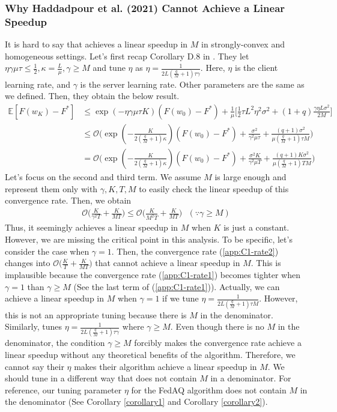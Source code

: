 \subsubsection{Why Haddadpour et al. (2021) Cannot Achieve a Linear Speedup}
It is hard to say that \cite{haddadpour2021federated} achieves a linear speedup in $M$ in strongly-convex and homogeneous settings. Let's first recap Corollary D.8 in \cite{haddadpour2021federated}. They let $\eta\gamma\mu\tau \leq \frac{1}{2}, \kappa = \frac{L}{\mu}, \gamma \geq M$ and tune $\eta$ as $\eta = \frac{1}{2L(\frac{q}{M}+1)\tau\gamma}$. Here, $\eta$ is the client learning rate, and $\gamma$ is the server learning rate. Other parameters are the same as we defined. Then, they obtain the below result.
\begin{align} \label{app:C1-rate1}
    \mathbb{E}[F(w_K)- F^*] &\leq \exp(-\eta\gamma\mu\tau K)(F(w_0) - F^*) + \frac{1}{\mu}\Big[\frac{1}{2}\tau L^2\eta^2\sigma^2 + (1+q)\frac{\gamma\eta L\sigma^2}{2M}\Big] \\
    &\leq \mathcal{O} \Big(\exp(-\frac{K}{2(\frac{q}{M}+1)\kappa})(F(w_0) - F^*) + \frac{\sigma^2}{\gamma^2\mu\tau} + \frac{(q+1)\sigma^2}{\mu(\frac{q}{M}+1)\tau M} \Big) \nonumber \\
    &= \mathcal{O} \Big(\exp(-\frac{K}{2(\frac{q}{M}+1)\kappa})(F(w_0) - F^*) + \frac{\sigma^2 K}{\gamma^2\mu T} + \frac{(q+1)K \sigma^2}{\mu(\frac{q}{M}+1)T M} \Big) \nonumber
\end{align}
Let's focus on the second and third term. We assume $M$ is large enough and represent them only with $\gamma, K, T, M$ to easily check the linear speedup of this convergence rate. Then, we obtain
\begin{align} \label{app:C1-rate2}
    \mathcal{O}\Big( \frac{K}{\gamma^2 T} + \frac{K}{MT}\Big) \leq \mathcal{O}\Big( \frac{K}{M^2 T} + \frac{K}{MT}\Big) \textrm{ }(\because \gamma \geq M)
\end{align}
Thus, it seemingly achieves a linear speedup in $M$ when $K$ is just a constant. However, we are missing the critical point in this analysis. To be specific, let's consider the case when $\gamma = 1$. Then, the convergence rate (\ref{app:C1-rate2}) changes into $\mathcal{O}\Big( \frac{K}{T} + \frac{K}{MT}\Big)$ that cannot achieve a linear speedup in $M$. This is implausible because the convergence rate (\ref{app:C1-rate1}) becomes tighter when $\gamma = 1$ than $\gamma \geq M$ (See the last term of (\ref{app:C1-rate1})). Actually, we can achieve a linear speedup in $M$ when $\gamma = 1$ if we tune $\eta = \frac{1}{2L(\frac{q}{M}+1)\tau M}$. However, this is not an appropriate tuning because there is $M$ in the denominator. Similarly, \cite{haddadpour2021federated} tunes $\eta = \frac{1}{2L(\frac{q}{M}+1)\tau\gamma}$ where $\gamma \geq M$. Even though there is no $M$ in the denominator, the condition $\gamma \geq M$ forcibly makes the convergence rate achieve a linear speedup without any theoretical benefits of the algorithm. Therefore, we cannot say their $\eta$ makes their algorithm achieve a linear speedup in $M$. We should tune in a different way that does not contain $M$ in a denominator. For reference, our tuning parameter $\eta$ for the FedAQ algorithm does not contain $M$ in the denominator (See Corollary \ref{corollary1} and Corollary \ref{corollary2}).
